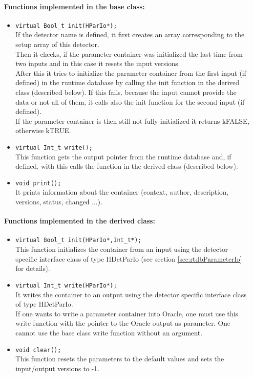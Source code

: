 \paragraph{Functions implemented in the base class:}
\begin{itemize}
  \item \verb+virtual Bool_t init(HParIo*);+\\
    If the detector name is defined, it first creates an array corresponding to the setup array of this detector.\\
    Then it checks, if the parameter container was initialized the last time from two inputs and in this case it resets 
    the input versions.\\
    After this it tries to initialize the parameter container from the first input (if defined) in the runtime database by 
    calling the init function in the derived class (described below). If this fails, because the input cannot provide the data 
    or not all of them, it calls also the init function for the second input (if defined).\\
    If the parameter container is then still not fully initialized it returns kFALSE, otherwise kTRUE.
  \item \verb+virtual Int_t write();+\\
     This function gets the output pointer from the runtime database and, if defined, with this calls the function
     in the derived class (described below).
  \item \verb+void print();+\\
  It prints information about the container (context, author, description, versions, status, changed ...).
\end{itemize}

\paragraph{Functions implemented in the derived class:}
\begin{itemize}
  \item \verb+virtual Bool_t init(HParIo*,Int_t*);+\\
    This function initializes the container from an input using the detector specific
    interface class of type HDetParIo (see section \ref{sec:rtdbParameterIo} for details).
  \item \verb+virtual Int_t write(HParIo*);+\\
    It writes the container to an output using the detector specific interface class of type HDetParIo.\\
    If one wants to write a parameter container into Oracle, one must use this write function with the pointer to the Oracle 
    output as parameter. One cannot use the base class write function without an argument.
  \item \verb+void clear();+\\
    This function resets the parameters to the default values and sets the input/output versions to -1.
\end{itemize}

